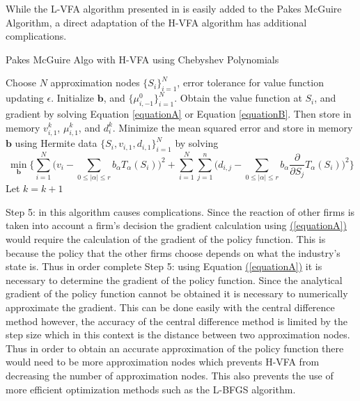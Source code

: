 \documentclass[12pt]{article}
\newcommand{\norm}[1]{\left\lVert#1\right\rVert}
\begin{document}
While the L-VFA algorithm presented in \citet{2015_Judd_Cai} is easily added to the Pakes McGuire Algorithm, a direct adaptation of the H-VFA algorithm has additional complications.

\begin{algorithm}[H]
  \caption{Pakes McGuire Algo with H-VFA using Chebyshev Polynomials}
  \begin{algorithmic}[1]
    \Procedure{}{} Choose $N$ approximation nodes $\{S_i\}_{i=1}^N$, error tolerance for value function updating $\epsilon$.
    \State Initialize $\boldsymbol{b}$, and $\{\mu^0_{i,-1}\}_{i=1}^N$.
    \While{$\norm{\hat{V}^{k}_1-\hat{V}^{k-1}_1} > \frac{\epsilon (1-\beta)}{2\beta}$}
    \State Obtain the value function at $S_i$, and gradient by solving Equation \eqref{equationA} or Equation \eqref{equationB}. Then store in memory $v^k_{i,1}$, $\mu^k_{i,1}$, and $d_{i}^k$.
    \State Minimize the mean squared error and store in memory $\boldsymbol{b}$ using Hermite data $\{S_i,v_{i,1},d_{i,1}\}_{i=1}^N$ by solving
\begin{equation*}
  \min_{\boldsymbol{b}} \Bigg \{\sum_{i=1}^N \bigg (v_i-\sum_{0\leq |\alpha|\leq r}b_\alpha T_\alpha(S_i) \bigg )^2+\sum_{i=1}^N \sum_{j=1}^{n} \bigg ( d_{i,j} - \sum_{0\leq |\alpha|\leq r}b_\alpha \frac{\partial}{\partial S_j}T_\alpha(S_i) \bigg )^2 \Bigg \}
\end{equation*}
    \State Let $k=k+1$
    \EndFor
    \EndWhile
    \EndProcedure
  \end{algorithmic}
\end{algorithm}

Step 5: in this algorithm causes complications. Since the reaction of other firms is taken into account a firm's decision the gradient calculation using \hyperref[equationA]{(\ref{equationA})} would require the calculation of the gradient of the policy function. This is because the policy that the other firms choose depends on what the industry's state is. Thus in order complete Step 5: using Equation \hyperref[equationA]{(\ref{equationA})} it is necessary to determine the gradient of the policy function. Since the analytical gradient of the policy function cannot be obtained it is necessary to numerically approximate the gradient. This can be done easily with the central difference method however, the accuracy of the central difference method is limited by the step size which in this context is the distance between two approximation nodes. Thus in order to obtain an accurate approximation of the policy function there would need to be more approximation nodes which prevents H-VFA from decreasing the number of approximation nodes. This also prevents the use of more efficient optimization methods such as the L-BFGS algorithm.
\end{document}
